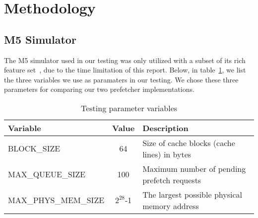 \section{Methodology}

\subsection{M5 Simulator}

The M5 simulator used in our testing was only utilized with a subset of its rich
feature set~\cite{user_doc}, due to the time limitation of this report.
 Below, in table~\ref{tab:test-params}, we
list the three variables we use as paramaters in our testing. We chose these
three parameters for comparing our two prefetcher implementations.

\begin{table}[h]
	\caption{Testing parameter variables}
	\begin{tabularx}{\linewidth}{|X|c|X|}
	\hline
	Variable & Value & Description \\
	\hline
	BLOCK\_SIZE & 64 & Size of cache blocks (cache lines) in bytes \\
	\hline
	MAX\_QUEUE\_SIZE & 100 & Maximum number of pending prefetch requests \\
	\hline
	MAX\_PHYS\_MEM\_SIZE & $2^{28}$-1 & The largest possible physical memory address \\
	\hline
	\end{tabularx}
	\label{tab:test-params}
\end{table}

